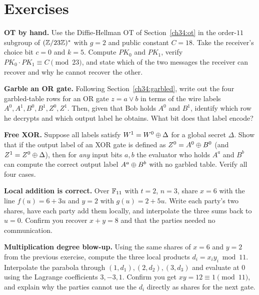 \section*{Exercises}

\begin{exercise}
\textbf{OT by hand.} Use the Diffie-Hellman OT of Section~\ref{ch34:ot} in the order-$11$ subgroup of $(\mathbb{Z}/23\mathbb{Z})^{*}$ with $g = 2$ and public constant $C = 18$. Take the receiver's choice bit $c = 0$ and $k = 5$. Compute $PK_0$ and $PK_1$, verify $PK_0 \cdot PK_1 \equiv C \pmod{23}$, and state which of the two messages the receiver can recover and why he cannot recover the other.
\end{exercise}

\begin{exercise}
\textbf{Garble an OR gate.} Following Section~\ref{ch34:garbled}, write out the four garbled-table rows for an OR gate $z = a \lor b$ in terms of the wire labels $A^0, A^1, B^0, B^1, Z^0, Z^1$. Then, given that Bob holds $A^0$ and $B^1$, identify which row he decrypts and which output label he obtains. What bit does that label encode?
\end{exercise}

\begin{exercise}
\textbf{Free XOR.} Suppose all labels satisfy $W^1 = W^0 \oplus \Delta$ for a global secret $\Delta$. Show that if the output label of an XOR gate is defined as $Z^0 = A^0 \oplus B^0$ (and $Z^1 = Z^0 \oplus \Delta$), then for \emph{any} input bits $a, b$ the evaluator who holds $A^a$ and $B^b$ can compute the correct output label $A^a \oplus B^b$ with no garbled table. Verify all four cases.
\end{exercise}

\begin{exercise}
\textbf{Local addition is correct.} Over $\mathbb{F}_{11}$ with $t = 2$, $n = 3$, share $x = 6$ with the line $f(u) = 6 + 3u$ and $y = 2$ with $g(u) = 2 + 5u$. Write each party's two shares, have each party add them locally, and interpolate the three sums back to $u = 0$. Confirm you recover $x + y = 8$ and that the parties needed no communication.
\end{exercise}

\begin{exercise}
\textbf{Multiplication degree blow-up.} Using the same shares of $x = 6$ and $y = 2$ from the previous exercise, compute the three local products $d_i = x_i y_i \bmod 11$. Interpolate the parabola through $(1,d_1),(2,d_2),(3,d_3)$ and evaluate at $0$ using the Lagrange coefficients $3, -3, 1$. Confirm you get $xy = 12 \equiv 1 \pmod{11}$, and explain why the parties cannot use the $d_i$ directly as shares for the next gate.
\end{exercise}

